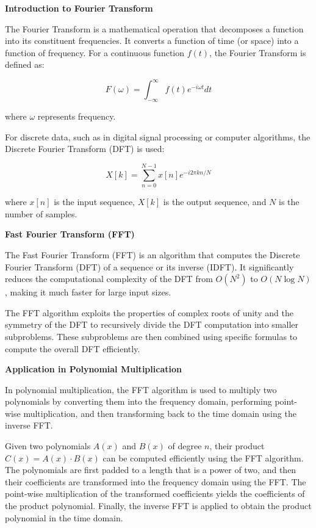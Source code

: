 \documentclass[12pt]{book} %
\begin{document}
\textbf{Introduction to Fourier Transform}

The Fourier Transform is a mathematical operation that decomposes a function into its constituent frequencies. It converts a function of time (or space) into a function of frequency. For a continuous function \( f(t) \), the Fourier Transform is defined as:

\[
F(\omega) = \int_{-\infty}^{\infty} f(t) e^{-i\omega t} dt
\]

where \( \omega \) represents frequency.

For discrete data, such as in digital signal processing or computer algorithms, the Discrete Fourier Transform (DFT) is used:

\[
X[k] = \sum_{n=0}^{N-1} x[n] e^{-i 2 \pi k n / N}
\]

where \( x[n] \) is the input sequence, \( X[k] \) is the output sequence, and \( N \) is the number of samples.

\textbf{Fast Fourier Transform (FFT)}

The Fast Fourier Transform (FFT) is an algorithm that computes the Discrete Fourier Transform (DFT) of a sequence or its inverse (IDFT). It significantly reduces the computational complexity of the DFT from \( O(N^2) \) to \( O(N \log N) \), making it much faster for large input sizes.

The FFT algorithm exploits the properties of complex roots of unity and the symmetry of the DFT to recursively divide the DFT computation into smaller subproblems. These subproblems are then combined using specific formulas to compute the overall DFT efficiently.

\textbf{Application in Polynomial Multiplication}

In polynomial multiplication, the FFT algorithm is used to multiply two polynomials by converting them into the frequency domain, performing point-wise multiplication, and then transforming back to the time domain using the inverse FFT.

Given two polynomials \( A(x) \) and \( B(x) \) of degree \( n \), their product \( C(x) = A(x) \cdot B(x) \) can be computed efficiently using the FFT algorithm. The polynomials are first padded to a length that is a power of two, and then their coefficients are transformed into the frequency domain using the FFT. The point-wise multiplication of the transformed coefficients yields the coefficients of the product polynomial. Finally, the inverse FFT is applied to obtain the product polynomial in the time domain.
\end{document}
